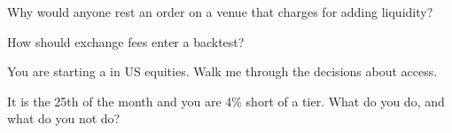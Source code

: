 \begin{interviewq}\label{iq:m1:getting-access-equities:3}
Why would anyone rest an order on a venue that charges for adding
liquidity?
\end{interviewq}

\begin{interviewq}\label{iq:m1:getting-access-equities:4}
How should exchange fees enter a backtest?
\end{interviewq}

\begin{interviewq}\label{iq:m1:getting-access-equities:5}
You are starting a  in US equities. Walk me through
the decisions about access.
\end{interviewq}

\begin{interviewq}\label{iq:m1:getting-access-equities:6}
It is the 25th of the month and you are 4\% short of a tier. What do you do,
and what do you not do?
\end{interviewq}
